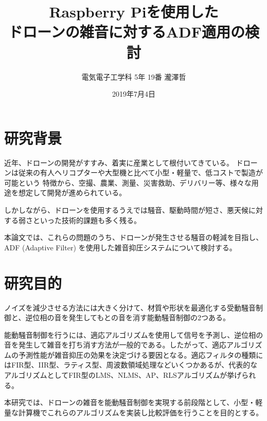 \documentclass[a4paper, twocolumn]{ltjsarticle}
\title{Raspberry Piを使用した\\ドローンの雑音に対するADF適用の検討}
\author{電気電子工学科 5年 19番 瀧澤哲}
\date{2019年7月4日}
\begin{document}
%

\maketitle
  
\section{研究背景}

  近年、ドローンの開発がすすみ、着実に産業として根付いてきている。%
  ドローンは従来の有人ヘリコプターや大型機と比べて小型・軽量で、低コストで製造が可能という%
  特徴から、空撮、農業、測量、災害救助、デリバリー等、様々な用途を想定して開発が進められている。

  しかしながら、ドローンを使用するうえでは騒音、駆動時間が短さ、悪天候に対する弱さといった技術的課題も多く残る。

  本論文では、これらの問題のうち、ドローンが発生させる騒音の軽減を目指し、ADF (Adaptive Filter) を使用した雑音抑圧システムについて検討する。

\section{研究目的}
  ノイズを減少させる方法には大きく分けて、材質や形状を最適化する受動騒音制御と、逆位相の音を発生してもとの音を消す能動騒音制御の2つある。


  能動騒音制御を行うには、適応アルゴリズムを使用して信号を予測し、逆位相の音を発生して雑音を打ち消す方法が一般的である。したがって、適応アルゴリズムの予測性能が雑音抑圧の効果を決定づける要因となる。適応フィルタの種類にはFIR型、IIR型、ラティス型、周波数領域処理などいくつかあるが、代表的なアルゴリズムとしてFIR型のLMS、NLMS、AP、RLSアルゴリズムが挙げられる。
  
  本研究では、ドローンの雑音を能動騒音制御を実現する前段階として、小型・軽量な計算機でこれらのアルゴリズムを実装し比較評価を行うことを目的とする。

  
\end{document}
